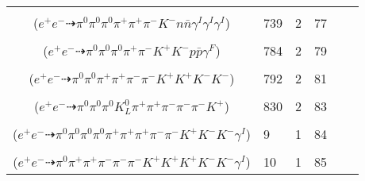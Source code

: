 \documentclass[landscape]{article}
\newcounter{rownumbers}
\newcommand\rn{\stepcounter{rownumbers}\arabic{rownumbers}}
\newcommand{\EOL}{\\} %
\newcommand{\topoTags}[1]{#1} %
\begin{document}
\begin{longtable}{clcccc}
\rn & \makecell[l]{ $ 
e^{+} e^{-} \rightarrow \pi^{0} \pi^{+} \rho^{+} K^{-} \Delta^{0} \bar{\Sigma}^{-} \gamma^{I} \gamma^{I} \gamma^{I} ,
\rho^{+} \rightarrow \pi^{0} \pi^{+} ,
\Delta^{0} \rightarrow \pi^{0} n ,
\bar{\Sigma}^{-} \rightarrow \pi^{-} \bar{n} 
$ \\ ($
e^{+} e^{-} \dashrightarrow \pi^{0} \pi^{0} \pi^{0} \pi^{+} \pi^{+} \pi^{-} K^{-} n \bar{n} \gamma^{I} \gamma^{I} \gamma^{I} 
$) } & \topoTags{739 & }2 & 77 \EOL

\rn & \makecell[l]{ $ 
e^{+} e^{-} \rightarrow \pi^{0} \rho^{+} \rho^{-} K^{+} K^{-} p \bar{p} ,
\rho^{+} \rightarrow \pi^{0} \pi^{+} ,
\rho^{-} \rightarrow \pi^{0} \pi^{-} \gamma^{F} 
$ \\ ($
e^{+} e^{-} \dashrightarrow \pi^{0} \pi^{0} \pi^{0} \pi^{+} \pi^{-} K^{+} K^{-} p \bar{p} \gamma^{F} 
$) } & \topoTags{784 & }2 & 79 \EOL

\rn & \makecell[l]{ $ 
e^{+} e^{-} \rightarrow \pi^{0} \pi^{0} \rho^{0} K^{*} \bar{K}^{*} \phi ,
\rho^{0} \rightarrow \pi^{+} \pi^{-} ,
K^{*} \rightarrow \pi^{-} K^{+} ,
\bar{K}^{*} \rightarrow \pi^{+} K^{-} ,
\phi \rightarrow K^{+} K^{-} 
$ \\ ($
e^{+} e^{-} \dashrightarrow \pi^{0} \pi^{0} \pi^{+} \pi^{+} \pi^{-} \pi^{-} K^{+} K^{+} K^{-} K^{-} 
$) } & \topoTags{792 & }2 & 81 \EOL

\rn & \makecell[l]{ $ 
e^{+} e^{-} \rightarrow \pi^{-} \rho^{+} \rho^{-} \omega \bar{K}^{0} K^{+} ,
\rho^{+} \rightarrow \pi^{0} \pi^{+} ,
\rho^{-} \rightarrow \pi^{0} \pi^{-} ,
\omega \rightarrow \pi^{0} \pi^{+} \pi^{-} ,
\bar{K}^{0} \rightarrow K_{L}^{0} 
$ \\ ($
e^{+} e^{-} \dashrightarrow \pi^{0} \pi^{0} \pi^{0} K_{L}^{0} \pi^{+} \pi^{+} \pi^{-} \pi^{-} \pi^{-} K^{+} 
$) } & \topoTags{830 & }2 & 83 \EOL

\rn & \makecell[l]{ $ 
e^{+} e^{-} \rightarrow \pi^{0} \rho^{0} \omega K^{0} \bar{K}^{*} K^{+} K^{-} \gamma^{I} ,
\rho^{0} \rightarrow \pi^{+} \pi^{-} ,
\omega \rightarrow \pi^{0} \pi^{+} \pi^{-} ,
K^{0} \rightarrow K_{S}^{0} ,
\bar{K}^{*} \rightarrow \pi^{+} K^{-} ,
K_{S}^{0} \rightarrow \pi^{0} \pi^{0} 
$ \\ ($
e^{+} e^{-} \dashrightarrow \pi^{0} \pi^{0} \pi^{0} \pi^{0} \pi^{+} \pi^{+} \pi^{+} \pi^{-} \pi^{-} K^{+} K^{-} K^{-} \gamma^{I} 
$) } & \topoTags{9 & }1 & 84 \EOL

\rn & \makecell[l]{ $ 
e^{+} e^{-} \rightarrow \pi^{0} \rho^{0} \pi^{-} \bar{K}^{0} K^{+} K^{+} K^{-} \phi \gamma^{I} ,
\rho^{0} \rightarrow \pi^{+} \pi^{-} ,
\bar{K}^{0} \rightarrow K_{S}^{0} ,
\phi \rightarrow K^{+} K^{-} ,
K_{S}^{0} \rightarrow \pi^{+} \pi^{-} 
$ \\ ($
e^{+} e^{-} \dashrightarrow \pi^{0} \pi^{+} \pi^{+} \pi^{-} \pi^{-} \pi^{-} K^{+} K^{+} K^{+} K^{-} K^{-} \gamma^{I} 
$) } & \topoTags{10 & }1 & 85 \EOL


\end{longtable}
\end{document}
